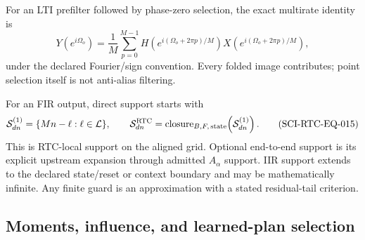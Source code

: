 For an LTI prefilter followed by phase-zero selection, the exact multirate
identity is
\begin{equation}
 Y(e^{i\Omega_o})=\frac{1}{M}\sum_{p=0}^{M-1}
 H\!\left(e^{i(\Omega_o+2\pi p)/M}\right)
 X\!\left(e^{i(\Omega_o+2\pi p)/M}\right),
 \tag{SCI-RTC-EQ-014}\label{eq:alias}
\end{equation}
under the declared Fourier/sign convention.  Every folded image contributes;
point selection itself is not anti-alias filtering.

For an FIR output, direct support starts with
\begin{equation}
 \mathcal S^{(1)}_{dn}=\{Mn-\ell:\ell\in\mathcal L\},
 \qquad
 \mathcal S^{\rm RTC}_{dn}=\operatorname{closure}_{B,F,\,\mathrm{state}}
                 \!\left(\mathcal S^{(1)}_{dn}\right).
 \tag{SCI-RTC-EQ-015}\label{eq:support}
\end{equation}
This is RTC-local support on the aligned grid.  Optional end-to-end support is
its explicit upstream expansion through admitted $A_\alpha$ support.  IIR
support extends to the declared state/reset or context boundary and may
be mathematically infinite.  Any finite guard is an approximation with a
stated residual-tail criterion.

\subsection{Moments, influence, and learned-plan selection}

